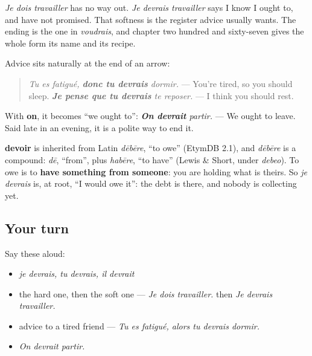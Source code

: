 \emph{Je dois travailler} has no way out. \emph{Je devrais travailler} says I know I ought to, and have not promised. That softness is the register advice usually wants. The ending is the one in \emph{voudrais}, and chapter two hundred and sixty-seven gives the whole form its name and its recipe.

\begin{grammarlens}[title={Grammar Lens: advice, with its reason}]
Advice sits naturally at the end of an arrow:

\begin{quote}
\emph{Tu es fatigué, \textbf{donc tu devrais} dormir.} — You're tired, so you should sleep. \emph{\textbf{Je pense que tu devrais} te reposer.} — I think you should rest.
\end{quote}

With \textbf{on}, it becomes \textquotedblleft{}we ought to\textquotedblright{}: \emph{\textbf{On devrait} partir.} — We ought to leave. Said late in an evening, it is a polite way to end it.
\end{grammarlens}

\begin{cousinweb}
\textbf{devoir} is inherited from Latin \emph{dēbēre}, \textquotedblleft{}to owe\textquotedblright{} (EtymDB 2.1), and \emph{dēbēre} is a compound: \emph{dē}, \textquotedblleft{}from\textquotedblright{}, plus \emph{habēre}, \textquotedblleft{}to have\textquotedblright{} (Lewis \& Short, under \emph{debeo}). To owe is to \textbf{have something from someone}: you are holding what is theirs. So \emph{je devrais} is, at root, \textquotedblleft{}I would owe it\textquotedblright{}: the debt is there, and nobody is collecting yet.
\end{cousinweb}

\subsection*{Your turn}
Say these aloud:

\begin{itemize}
\raggedright
  \item \emph{je devrais, tu devrais, il devrait}
  \item the hard one, then the soft one — \emph{Je dois travailler.} then \emph{Je devrais travailler.}
  \item advice to a tired friend — \emph{Tu es fatigué, alors tu devrais dormir.}
  \item \emph{On devrait partir.}
\end{itemize}

